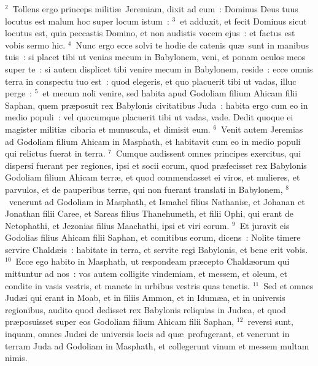 ${}^{2}$~Tollens ergo princeps militi\ae\ Jeremiam, dixit ad eum~: Dominus Deus tuus locutus est malum hoc super locum istum~:
${}^{3}$~et adduxit, et fecit Dominus sicut locutus est, quia peccastis Domino, et non audistis vocem ejus~: et factus est vobis sermo hic.
${}^{4}$~Nunc ergo ecce solvi te hodie de catenis qu\ae\ sunt in manibus tuis~: si placet tibi ut venias mecum in Babylonem, veni, et ponam oculos meos super te~: si autem displicet tibi venire mecum in Babylonem, reside~: ecce omnis terra in conspectu tuo est~: quod elegeris, et quo placuerit tibi ut vadas, illuc perge~:
${}^{5}$~et mecum noli venire, sed habita apud Godoliam filium Ahicam filii Saphan, quem pr\ae posuit rex Babylonis civitatibus Juda~: habita ergo cum eo in medio populi~: vel quocumque placuerit tibi ut vadas, vade. Dedit quoque ei magister militi\ae\ cibaria et munuscula, et dimisit eum.
${}^{6}$~Venit autem Jeremias ad Godoliam filium Ahicam in Masphath, et habitavit cum eo in medio populi qui relictus fuerat in terra.
${}^{7}$~Cumque audissent omnes principes exercitus, qui dispersi fuerant per regiones, ipsi et socii eorum, quod pr\ae fecisset rex Babylonis Godoliam filium Ahicam terr\ae , et quod commendasset ei viros, et mulieres, et parvulos, et de pauperibus terr\ae , qui non fuerant translati in Babylonem,
${}^{8}$~venerunt ad Godoliam in Masphath, et Ismahel filius Nathani\ae , et Johanan et Jonathan filii Caree, et Sareas filius Thanehumeth, et filii Ophi, qui erant de Netophathi, et Jezonias filius Maachathi, ipsi et viri eorum.
${}^{9}$~Et juravit eis Godolias filius Ahicam filii Saphan, et comitibus eorum, dicens~: Nolite timere servire Chald\ae is~: habitate in terra, et servite regi Babylonis, et bene erit vobis.
${}^{10}$~Ecce ego habito in Masphath, ut respondeam pr\ae cepto Chald\ae orum qui mittuntur ad nos~: vos autem colligite vindemiam, et messem, et oleum, et condite in vasis vestris, et manete in urbibus vestris quas tenetis.
${}^{11}$~Sed et omnes Jud\ae i qui erant in Moab, et in filiis Ammon, et in Idum\ae a, et in universis regionibus, audito quod dedisset rex Babylonis reliquias in Jud\ae a, et quod pr\ae posuisset super eos Godoliam filium Ahicam filii Saphan,
${}^{12}$~reversi sunt, inquam, omnes Jud\ae i de universis locis ad qu\ae\ profugerant, et venerunt in terram Juda ad Godoliam in Masphath, et collegerunt vinum et messem multam nimis.


